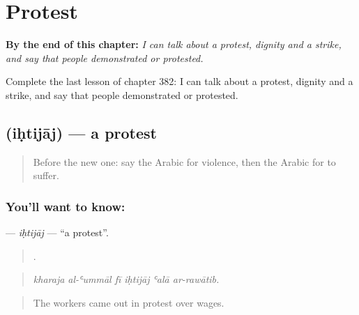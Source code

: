 
\chapter{Protest}
\label{ch:ar-protest}

\begin{chapteropening}
\textbf{By the end of this chapter:} \emph{I can talk about a protest, dignity and a strike, and say that people demonstrated or protested.}

Complete the last lesson of chapter 382: I can talk about a protest, dignity and a strike, and say that people demonstrated or protested.
\end{chapteropening}

\section[\texorpdfstring{\ar{احتجاج} (iḥtijāj)}{احتجاج (iḥtijāj)}]{ (iḥtijāj) — a protest}

\label{lesson:AR-C382-ihtijaj}



\begin{quote}
Before the new one: say the Arabic for violence, then the Arabic for to suffer.
\end{quote}

\subsection*{You'll want to know: }
\textbf{} — \emph{iḥtijāj} — \textquotedblleft{}a protest\textquotedblright{}.

\begin{quote}
     .
\end{quote}

\begin{quote}
\emph{kharaja al-ʿummāl fī iḥtijāj ʿalā ar-rawātib.}
\end{quote}

\begin{quote}
The workers came out in protest over wages.
\end{quote}

